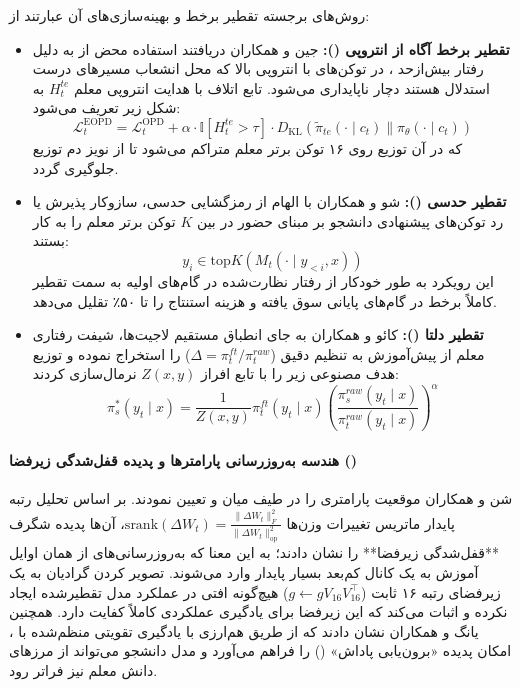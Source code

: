 روش‌های برجسته تقطیر برخط و بهینه‌سازی‌های آن عبارتند از:
\begin{itemize}
    \item \textbf{تقطیر برخط آگاه از انتروپی ():} جین و همکاران \cite{jin2026entropy} دریافتند استفاده محض از  به دلیل رفتار بیش‌ازحد ، در توکن‌های با انتروپی بالا که محل انشعاب مسیرهای درست استدلال هستند دچار ناپایداری می‌شود. تابع اتلاف  با هدایت انتروپی معلم $H_t^{te}$ به شکل زیر تعریف می‌شود:
    \begin{equation}
        \mathcal{L}_t^{\text{EOPD}} = \mathcal{L}_t^{\text{OPD}} + \alpha \cdot \mathbb{I}[H_t^{te} > \tau] \cdot D_{\text{KL}}(\tilde{\pi}_{te}(\cdot \mid c_t) \parallel \pi_\theta(\cdot \mid c_t))
    \end{equation}
    که در آن توزیع  روی ۱۶ توکن برتر معلم متراکم می‌شود تا از نویز دم توزیع جلوگیری گردد.
    \item \textbf{تقطیر حدسی ():} شو و همکاران \cite{xu2025speculative} با الهام از رمزگشایی حدسی، سازوکار پذیرش یا رد توکن‌های پیشنهادی دانشجو بر مبنای حضور در بین $K$ توکن برتر معلم را به کار بستند:
    \begin{equation}
        y_i \in \text{top}K(M_t(\cdot \mid y_{<i}, x))
    \end{equation}
    این رویکرد به طور خودکار از رفتار نظارت‌شده در گام‌های اولیه به سمت تقطیر کاملاً برخط در گام‌های پایانی سوق یافته و هزینه استنتاج را تا ۵۰٪ تقلیل می‌دهد.
    \item \textbf{تقطیر دلتا ():} کائو و همکاران \cite{cao2025delta} به جای انطباق مستقیم لاجیت‌ها، شیفت رفتاری معلم از پیش‌آموزش به تنظیم دقیق ($\Delta = \pi_t^{ft} / \pi_t^{raw}$) را استخراج نموده و توزیع هدف مصنوعی زیر را با تابع افراز $Z(x, y)$ نرمال‌سازی کردند:
    \begin{equation}
        \pi_s^*(y_t \mid x) = \frac{1}{Z(x, y)} \pi_t^{ft}(y_t \mid x) \left( \frac{\pi_s^{raw}(y_t \mid x)}{\pi_t^{raw}(y_t \mid x)} \right)^\alpha
    \end{equation}
\end{itemize}

\paragraph*{هندسه به‌روزرسانی پارامترها و پدیده قفل‌شدگی زیرفضا ()}
شن و همکاران \cite{shen2026geometry} موقعیت پارامتری  را در طیف میان  و  تعیین نمودند. بر اساس تحلیل رتبه پایدار ماتریس تغییرات وزن‌ها $\text{srank}(\Delta W_t) = \frac{\|\Delta W_t\|_F^2}{\|\Delta W_t\|_{\text{op}}^2}$، آن‌ها پدیده شگرف **قفل‌شدگی زیرفضا** را نشان دادند؛ به این معنا که به‌روزرسانی‌های  از همان اوایل آموزش به یک کانال کم‌بعد بسیار پایدار وارد می‌شوند. تصویر کردن گرادیان به یک زیرفضای رتبه ۱۶ ثابت ($g \leftarrow g V_{16} V_{16}^\top$) هیچ‌گونه افتی در عملکرد مدل تقطیرشده ایجاد نکرده و اثبات می‌کند که این زیرفضا برای یادگیری عملکردی کاملاً کفایت دارد. همچنین یانگ و همکاران \cite{yang2026learning} نشان دادند که  از طریق هم‌ارزی با یادگیری تقویتی منظم‌شده با ، امکان پدیده «برون‌یابی پاداش» () را فراهم می‌آورد و مدل دانشجو می‌تواند از مرزهای دانش معلم نیز فراتر رود.

